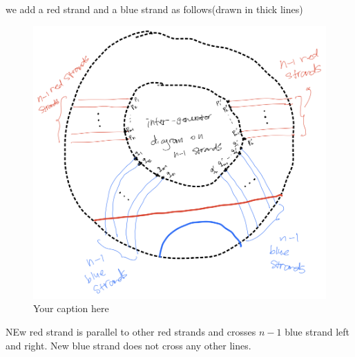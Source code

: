 we add a red strand and a blue strand as follows(drawn in thick lines)

\begin{figure}[H] %
    \centering
    \includegraphics[width=\linewidth]{diagrams/definition14-1/4.png} %
    \caption{Your caption here}
    \label{fig:your-label}
\end{figure}

NEw red strand is parallel to other red strands and crosses $n-1$ blue strand left and right. New blue strand does not cross any other lines.